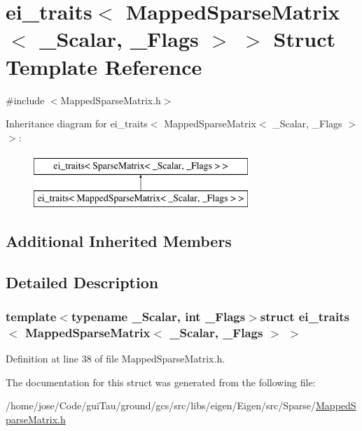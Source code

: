 \hypertarget{structei__traits_3_01_mapped_sparse_matrix_3_01___scalar_00_01___flags_01_4_01_4}{\section{ei\-\_\-traits$<$ Mapped\-Sparse\-Matrix$<$ \-\_\-\-Scalar, \-\_\-\-Flags $>$ $>$ Struct Template Reference}
\label{structei__traits_3_01_mapped_sparse_matrix_3_01___scalar_00_01___flags_01_4_01_4}
}


{\ttfamily \#include $<$Mapped\-Sparse\-Matrix.\-h$>$}

Inheritance diagram for ei\-\_\-traits$<$ Mapped\-Sparse\-Matrix$<$ \-\_\-\-Scalar, \-\_\-\-Flags $>$ $>$\-:\begin{figure}[H]
\begin{center}
\leavevmode
\includegraphics[height=2.000000cm]{structei__traits_3_01_mapped_sparse_matrix_3_01___scalar_00_01___flags_01_4_01_4}
\end{center}
\end{figure}
\subsection*{Additional Inherited Members}


\subsection{Detailed Description}
\subsubsection*{template$<$typename \-\_\-\-Scalar, int \-\_\-\-Flags$>$struct ei\-\_\-traits$<$ Mapped\-Sparse\-Matrix$<$ \-\_\-\-Scalar, \-\_\-\-Flags $>$ $>$}



Definition at line 38 of file Mapped\-Sparse\-Matrix.\-h.



The documentation for this struct was generated from the following file\-:\begin{DoxyCompactItemize}
\item 
/home/jose/\-Code/gui\-Tau/ground/gcs/src/libs/eigen/\-Eigen/src/\-Sparse/\hyperlink{_mapped_sparse_matrix_8h}{Mapped\-Sparse\-Matrix.\-h}\end{DoxyCompactItemize}

